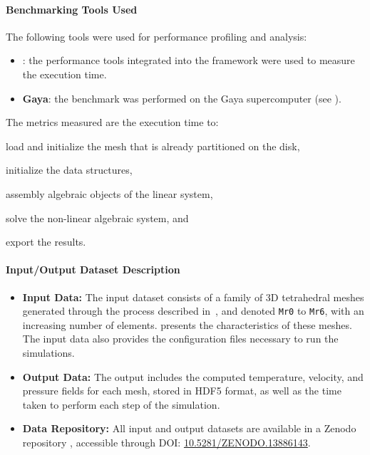 \paragraph{Benchmarking Tools Used}

The following tools were used for performance profiling and analysis:
\begin{itemize}
    \item \textbf{\Feelpp}: the performance tools integrated into the \Feelpp framework were used to measure the execution time.
    \item \textbf{Gaya}: the benchmark was performed on the Gaya supercomputer (see ).
\end{itemize}

The metrics measured are the execution time to:
\begin{inparaenum}[\it (i)]
    \item load and initialize the mesh that is already partitioned on the disk,
    \item initialize the data structures,
    \item assembly algebraic objects of the linear system,
    \item solve the non-linear algebraic system, and
    \item export the results.
\end{inparaenum}


\paragraph{Input/Output Dataset Description}

\begin{itemize}
    \item \textbf{Input Data:} The input dataset consists of a family of 3D tetrahedral meshes generated through the process described in~\cite{chabannes_3d_2024}, and denoted \texttt{Mr0} to \texttt{Mr6}, with an increasing number of elements.
     presents the characteristics of these meshes.
    The input data also provides the configuration files necessary to run the simulations.
    \item \textbf{Output Data:} The output includes the computed temperature, velocity, and pressure fields for each mesh, stored in HDF5 format, as well as the time taken to perform each step of the simulation.
    \item \textbf{Data Repository:} All input and output datasets are available in a Zenodo repository \cite{saigre_mesh_2024}, accessible through DOI: \href{https://doi.org/10.5281/ZENODO.13886143}{10.5281/ZENODO.13886143}.
\end{itemize}


